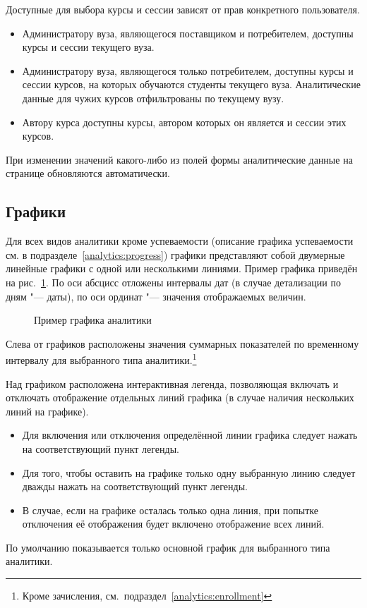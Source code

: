 Доступные для выбора курсы и сессии зависят от прав конкретного пользователя.
\begin{itemize}
	\item Администратору вуза, являющегося поставщиком и потребителем, доступны курсы и сессии текущего вуза.
	\item Администратору вуза, являющегося только потребителем, доступны курсы и сессии курсов, на которых 
	обучаются студенты текущего вуза. Аналитические данные для чужих курсов отфильтрованы по текущему вузу.
	\item Автору курса доступны курсы, автором которых он является и сессии этих курсов.
\end{itemize}


При изменении значений какого-либо из полей формы аналитические данные на странице обновляются автоматически.

\subsection{Графики}
\label{analytics:charts}

Для всех видов аналитики кроме успеваемости (описание графика успеваемости см. в подразделе~\ref{analytics:progress}) 
графики представляют собой двумерные линейные графики с одной или несколькими линиями. Пример графика
приведён на рис.~\ref{analytics:chart}. По оси абсцисс отложены интервалы дат (в случае 
детализации по дням "--- даты), по оси ординат "--- значения отображаемых величин. 

\begin{figure}[H]
	\caption{Пример графика аналитики}
	\label{analytics:chart}
\end{figure}

Слева от графиков расположены значения суммарных показателей по временному интервалу для выбранного 
типа аналитики.\footnote{Кроме зачисления, см.\ подраздел~\ref{analytics:enrollment}}

Над графиком расположена интерактивная легенда, позволяющая включать и отключать отображение отдельных линий
графика (в случае наличия нескольких линий на графике).
\begin{itemize}
	\item Для включения или отключения определённой линии графика следует нажать на соответствующий пункт легенды.
	\item Для того, чтобы оставить на графике только одну выбранную линию следует дважды нажать на соответствующий пункт легенды.
	\item В случае, если на графике осталась только одна линия, при попытке отключения её отображения будет включено отображение всех линий. 
\end{itemize}
По умолчанию показывается только основной график для выбранного типа аналитики.

